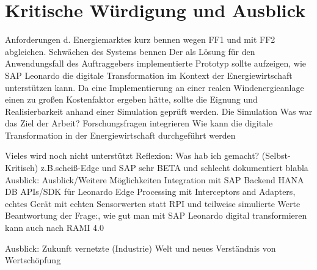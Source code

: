 \section{Kritische Würdigung und Ausblick}


Anforderungen d. Energiemarktes kurz bennen wegen FF1 und mit FF2 abgleichen. Schwächen des Systems bennen 
Der als Lösung für den Anwendungsfall des Auftraggebers implementierte Prototyp sollte aufzeigen, wie SAP Leonardo die digitale Transformation im Kontext der Energiewirtschaft unterstützen kann. Da eine Implementierung an einer realen Windenergieanlage einen zu großen Kostenfaktor ergeben hätte, sollte die Eignung und Realisierbarkeit anhand einer Simulation geprüft werden. Die Simulation 
Was war das Ziel der Arbeit? Forschungsfragen integrieren
Wie kann die digitale Transformation in der Energiewirtschaft durchgeführt werden

Vieles wird noch nicht unterstützt
Reflexion:
Was hab ich gemacht? (Selbst-Kritisch) z.B.scheiß-Edge und SAP sehr BETA und schlecht dokumentiert blabla
\newline
Ausblick:
Ausblick/Weitere Möglichkeiten
Integration mit SAP Backend
HANA DB
APIs/SDK für Leonardo
Edge Processing mit Interceptors and Adapters, echtes Gerät mit echten Sensorwerten statt RPI und teilweise simulierte Werte
\newline
Beantwortung der Frage:, wie gut man mit SAP Leonardo digital transformieren kann auch nach RAMI 4.0

Ausblick: Zukunft vernetzte (Industrie) Welt und neues Verständnis von Wertschöpfung
\newpage
